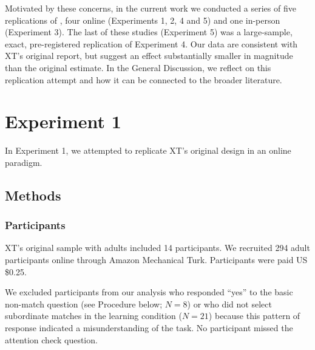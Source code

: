 \documentclass[man]{apa2}
\begin{document}
Motivated by these concerns, in the current work we conducted a series of five replications of , four online (Experiments 1, 2,  4 and 5) and one in-person (Experiment 3). The last of these studies (Experiment 5) was a large-sample, exact, pre-registered replication of Experiment 4. Our data are consistent with XT's original report, but suggest an effect substantially smaller in magnitude than the original estimate. In the General Discussion, we reflect on this replication attempt and how it can be connected to the broader literature. 
 
\section{Experiment 1} 
In Experiment 1, we attempted to replicate XT's original design in an online paradigm. 

\subsection{Methods}
\subsubsection{Participants} 
XT's original sample with adults included 14 participants. We recruited 294 adult participants online through Amazon Mechanical Turk. Participants were paid US \$0.25. 

We excluded participants from our analysis who responded ``yes'' to the basic non-match question (see Procedure below; $N=8$) or who did not select subordinate matches in the learning condition ($N = 21$) because this pattern of response indicated a misunderstanding of the task. No participant missed the attention check question. %
\end{document}
